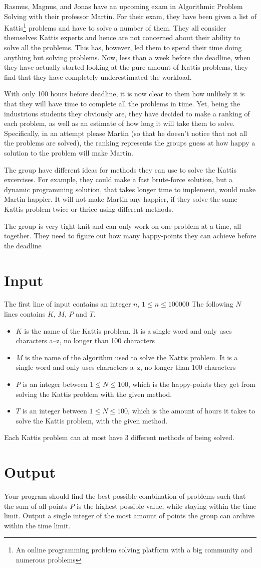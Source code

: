 Rasmus, Magnus, and Jonas have an upcoming exam in Algorithmic Problem Solving with their professor Martin. For their exam, they have been given a list of Kattis\footnote{An online programming problem solving platform with a big community and numerous problems} problems and have to solve a number of them. They all consider themselves Kattis experts and hence are not concerned about their ability to solve all the problems. This has, however, led them to spend their time doing anything but solving problems. Now, less than a week before the deadline, when they have actually started looking at the pure amount of Kattis problems, they find that they have completely underestimated the workload.

With only 100 hours before deadline, it is now clear to them how unlikely it is that they will have time to complete all the problems in time. Yet, being the industrious students they obviously are, they have decided to make a ranking of each problem, as well as an estimate of how long it will take them to solve. Specifically, in an attempt please Martin (so that he doesn't notice that not all the problems are solved), the ranking represents the groups guess at how happy a solution to the problem will make Martin. 

The group have different ideas for methods they can use to solve the Kattis excercises. For example, they could make a fast brute-force solution, but a dynamic programming solution, that takes longer time to implement, would make Martin happier. It will not make Martin any happier, if they solve the same Kattis problem twice or thrice using different methods. 

The group is very tight-knit and can only work on one problem at a time, all together. They need to figure out how many happy-points they can achieve before the deadline

\section*{Input}
The first line of input contains an integer $n$, $1\leq n\leq 100000$
The following $N$ lines contains $K$, $M$, $P$ and $T$. 
\begin{itemize}
    \item $K$ is the name of the Kattis problem. It is a single word and only uses characters a–z, no longer than 100 characters
    \item  $M$ is the name of the algorithm used to solve the Kattis problem. It is a single word and only uses characters a–z, no longer than 100 characters
    \item  $P$ is an integer between $1\leq N\leq 100$, which is the happy-points they get from solving the Kattis problem with the given method.
    \item $T$ is an integer between $1\leq N\leq 100$, which is the amount of hours it takes to solve the Kattis problem, with the given method.
\end{itemize}
Each Kattis problem can at most have 3 different methods of being solved.

\section*{Output}
Your program should find the best possible combination of problems such that the sum of all points $P$ is the highest possible value, while staying within the time limit.
Output a single integer of the most amount of points the group can archive within the time limit.
